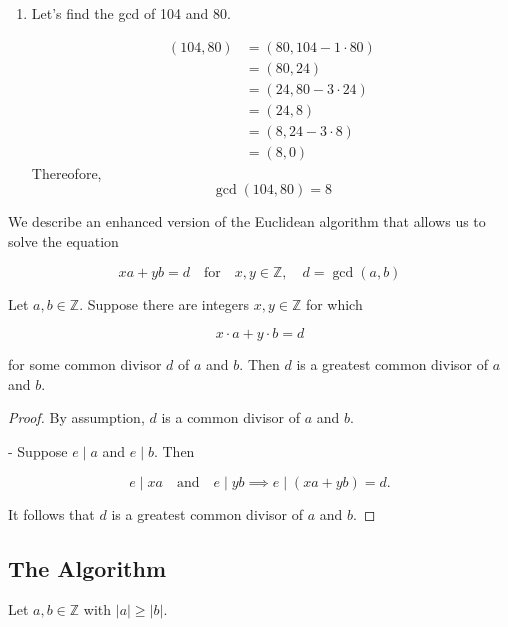 \documentclass[11pt, draft]{article}
\begin{document}
\begin{enumerate}
    \item Let's find the gcd of 104 and 80.

          \begin{align*}
              (104, 80) & = (80, 104 - 1 \cdot 80) \\
                        & = (80, 24)               \\
                        & = (24, 80 - 3 \cdot 24)  \\
                        & = (24, 8)                \\
                        & = (8, 24 - 3 \cdot 8)    \\
                        & = (8, 0)
          \end{align*}
          Thereofore,
          \[
              \gcd(104,80) = 8
          \]
\end{enumerate}

We describe an enhanced version of the Euclidean algorithm that allows us to
solve the equation

\[
    x a + y b = d \quad \text{for} \quad x, y \in \mathbb{Z}, \quad d = \operatorname{gcd}(a, b)
\]

\begin{proposition} Let \(a, b \in \mathbb{Z}\). Suppose there are integers \(x, y \in \mathbb{Z}\) for which

    \[
        x \cdot a + y \cdot b = d
    \]

    for some common divisor \(d\) of \(a\) and \(b\). Then \(d\) is a greatest
    common divisor of \(a\) and \(b\).
\end{proposition}
\begin{proof} By assumption, \(d\) is a common divisor of \(a\) and \(b\).

    - Suppose \(e \mid a\) and \(e \mid b\). Then

    \[
        e \mid xa \quad \text{and} \quad e \mid yb \implies e \mid (xa + yb) = d.
    \]

    It follows that \(d\) is a greatest common divisor of \(a\) and \(b\).

\end{proof}
\subsection{The Algorithm}

Let \(a, b \in \mathbb{Z}\) with \(|a| \geq |b|\).
\end{document}
